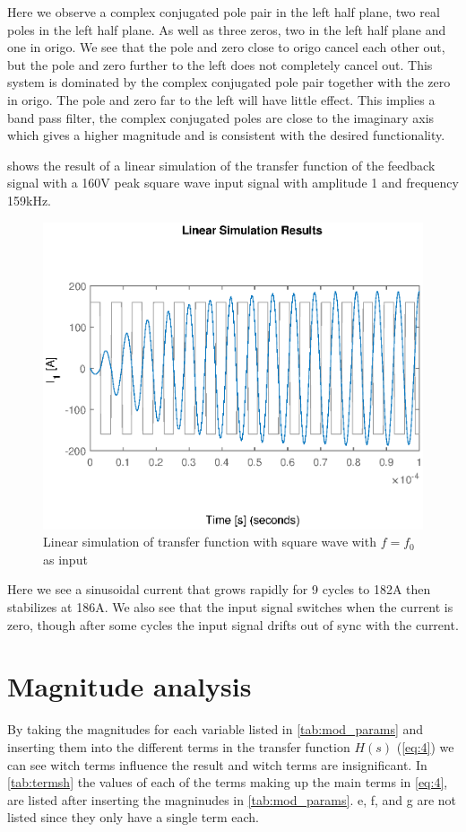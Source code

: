 Here we observe a complex conjugated pole pair in the left half plane, two real poles in the left half plane. As well as three zeros, two in the left half plane and one in origo. We see that the pole and zero close to origo cancel each other out, but the pole and zero further to the left does not completely cancel out. This system is dominated by the complex conjugated pole pair together with the zero in origo. The pole and zero far to the left will have little effect. This implies a band pass filter, the complex conjugated poles are close to the imaginary axis which gives a higher magnitude and is consistent with the desired functionality.

 shows the result of a linear simulation of the transfer function of the feedback signal with a 160V peak square wave input signal with amplitude 1 and frequency 159kHz.

\begin{figure}[H]
    \centering
    \includegraphics[width=\textwidth]{img/FeedBackSimulation.eps}
    \caption{Linear simulation of transfer function with square wave with $f=f_0$ as input}
    \label{fig:fblinsim}
\end{figure}

Here we see a sinusoidal current that grows rapidly for 9 cycles to 182A then stabilizes at 186A. We also see that the input signal switches when the current is zero, though after some cycles the input signal drifts out of sync with the current.

\newpage
\section{Magnitude analysis}
By taking the magnitudes for each variable listed in \cref{tab:mod_params} and inserting them into the different terms in the transfer function $H(s)$ (\cref{eq:4}) we can see witch terms influence the result and witch terms are insignificant. In \cref{tab:termsh} the values of each of the terms making up the main terms in \cref{eq:4}, are listed after inserting the magninudes in \cref{tab:mod_params}. e, f, and g are not listed since they only have a single term each.

